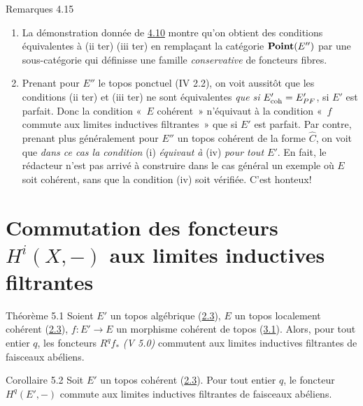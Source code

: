\documentclass[10pt]{../fichiers-configuration-latex/smfart}
\begin{document}
\begin{enonce*}[remark]{Remarques 4.15}
\begin{enumerate}
\renewcommand{\theenumi}{\alph{enumi}}
\renewcommand{\labelenumi}{\theenumi)}
\item La démonstration donnée de \hyperref[VI.prop4.10]{4.10} montre qu'on obtient des
  conditions équivalentes à (ii ter) \resp (iii ter) en remplaçant
  la catégorie $\operatorname{\mathbf{Point}}(E'')$ par une sous-catégorie qui définisse une
  famille \emph{conservative} de foncteurs fibres.

\item Prenant pour $E''$ le topos ponctuel (IV 2.2), on voit aussitôt
  que les conditions (ii ter) et (iii ter) ne sont équivalentes
  \emph{que si} $E'_{\mathrm{coh}} = E'_{PF}$, \ie si $E'$ est
  parfait. Donc la condition « $E$ cohérent » n'équivaut à la
  condition « $f$ commute aux limites inductives filtrantes » que
  si $E'$ est parfait. Par contre, prenant plus généralement pour
  $E''$ un topos cohérent de la forme $\widehat{C}$, on voit que
  \emph{dans ce cas la condition} (i) \emph{équivaut à} (iv) \emph{pour tout
  $E'$}. En fait, le rédacteur n'est pas arrivé à construire dans le
  cas général un exemple où $E$ soit cohérent, sans que la condition
  (iv) soit vérifiée. C'est honteux!
\end{enumerate}
\end{enonce*}

\section{Commutation des foncteurs $H^i(X, -)$ aux limites inductives
  filtrantes}\pageoriginale

\begin{enonce*}{Théorème 5.1}
Soient $E'$ un topos algébrique (\hyperref[VI.def2.3]{2.3}), $E$ un topos localement
cohérent (\hyperref[VI.def2.3]{2.3}), $f : E' \to E$ un morphisme cohérent de topos
(\hyperref[VI.def3.1]{3.1}). Alors, pour tout entier $q$, les foncteurs $R^q f_{\ast}$ \emph{(V
5.0)} commutent aux limites inductives filtrantes de faisceaux abéliens.
\end{enonce*}

\begin{enonce*}{Corollaire 5.2}
Soit $E'$ un topos cohérent (\hyperref[VI.def2.3]{2.3}). Pour tout entier $q$, le foncteur
$H^q(E', -)$ commute aux limites inductives filtrantes de faisceaux abéliens.
\end{enonce*}
\end{document}
